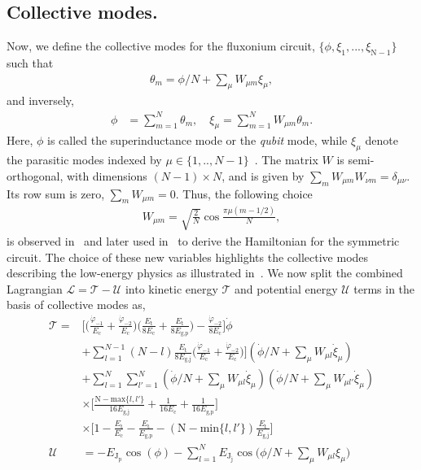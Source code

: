\documentclass[%
reprint,
superscriptaddress,
 amsmath,amssymb,
 aps,
 prx,
longbibliography,
floatfix,
]{revtex4-2}
\begin{document}
\subsection{Collective modes.} 
Now, we define the collective modes for the fluxonium circuit, $\{\phi,\xi_1,...,\xi_{\textrm{N}-1}\}$ such that 
\begin{align}
    \theta_m=\phi/N+\sum_\mu W_{\mu m}\xi_\mu,
\end{align}
and inversely,
\begin{align}
    \phi&=\sum_{m=1}^N\theta_m,\quad \xi_\mu=\sum_{m=1}^N W_{\mu m}\theta_m.
\end{align}
Here, $\phi$ is called the superinductance mode or the \emph{qubit} mode, while $\xi_\mu$ denote the parasitic modes indexed by $\mu\in\{1,..,N-1\}$~\cite{ferguson2013symmetries}. The matrix $W$ is semi-orthogonal, with dimensions $(N-1)\times N$, and is given by $\sum_m W_{\mu m}W_{\nu m}=\delta_{\mu \nu}$. Its row sum is zero, $\sum_mW_{\mu m}=0$. Thus, the following choice
\begin{align}
    W_{\mu m}=\sqrt{\frac{2}{N}}\cos{\frac{\pi\mu(m-1/2)}{N}},
\end{align}
is observed in~\cite{ferguson2013symmetries} and later used in~\cite{viola2015collective} to derive the Hamiltonian for the symmetric circuit. The choice of these new variables highlights the collective modes describing the low-energy physics as illustrated in~\cite{catelani2011relaxation,koch2009charging,manucharyan2009fluxonium}. We now split the combined Lagrangian $\mathcal{L}=\mathcal{T}-\mathcal{U}$ into kinetic energy $\mathcal{T}$ and potential energy $\mathcal{U}$ terms in the basis of collective modes as,
\begin{align}
\mathcal{T}=&\Big[\Big(\frac{\dot{\varphi}_{-1}}{E_{\textrm{c}}}+\frac{\dot{\varphi}_{-2}}{E_{\textrm{c}}}\Big)\Big(\frac{E_{\textrm{t}}}{8E_{\textrm{c}}}+\frac{E_{\textrm{t}}}{8E_{\textrm{g,p}}}\Big)-\frac{\dot{\varphi}_{-2}}{8E_{\textrm{c}}}\Big]\dot{\phi}\nonumber\\&+\sum_{l=1}^{N-1}(N-l)\frac{E_{\textrm{t}}}{8E_{\textrm{g,j}}}\Big(\frac{\dot{\varphi}_{-1}}{E_{\textrm{c}}}+\frac{\dot{\varphi}_{-2}}{E_{\textrm{c}}}\Big)\Big](\dot{\phi}/N+\sum_\mu W_{\mu l}\dot{\xi}_\mu)\nonumber\\
  &+\sum_{l=1}^N\sum_{l'=1}^N(\dot{\phi}/N+\sum_\mu W_{\mu l}\dot{\xi}_\mu)(\dot{\phi}/N+\sum_\mu W_{\mu l'}\dot{\xi}_\mu)\nonumber\\
  &\times\Big[\frac{\textrm{N}-\text{max}\{l,l'\}}{16E_\textrm{g,j}}+\frac{1}{16E_\textrm{c}}+\frac{1}{16E_\textrm{g,p}}\Big]\nonumber\\&\times\Big[1-\frac{E_\textrm{t}}{E_\textrm{c}}-\frac{E_\textrm{t}}{E_\textrm{g,p}}-(\textrm{N}-\text{min}\{l,l'\})\frac{E_\textrm{t}}{E_\textrm{g,j}}\Big]\label{eq:kin-energy}\\
    \mathcal{U}&=-E_{\textrm{J}_\textrm{p}}\cos(\phi)-\sum_{l=1}^NE_{\textrm{J}_\textrm{j}}\cos\Big(\phi/N+\sum_\mu W_{\mu l}\xi_\mu\Big)\label{eq:pot-energy}
\end{align}
\end{document}
